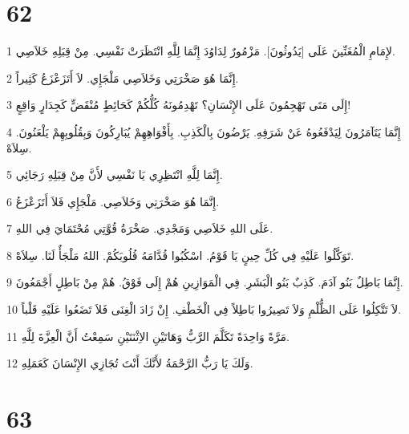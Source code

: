 \chapter{62}

\par 1 لإِمَامِ الْمُغَنِّينَ عَلَى [يَدُوثُونَ]. مَزْمُورٌ لِدَاوُدَ إِنَّمَا لِلَّهِ انْتَظَرَتْ نَفْسِي. مِنْ قِبَلِهِ خَلاَصِي.
\par 2 إِنَّمَا هُوَ صَخْرَتِي وَخَلاَصِي مَلْجَإِي. لاَ أَتَزَعْزَعُ كَثِيراً.
\par 3 إِلَى مَتَى تَهْجِمُونَ عَلَى الإِنْسَانِ؟ تَهْدِمُونَهُ كُلُّكُمْ كَحَائِطٍ مُنْقَضٍّ كَجِدَارٍ وَاقِعٍ!
\par 4 إِنَّمَا يَتَآمَرُونَ لِيَدْفَعُوهُ عَنْ شَرَفِهِ. يَرْضُونَ بِالْكَذِبِ. بِأَفْوَاهِهِمْ يُبَارِكُونَ وَبِقُلُوبِهِمْ يَلْعَنُونَ. سِلاَهْ.
\par 5 إِنَّمَا لِلَّهِ انْتَظِرِي يَا نَفْسِي لأَنَّ مِنْ قِبَلِهِ رَجَائِي.
\par 6 إِنَّمَا هُوَ صَخْرَتِي وَخَلاَصِي. مَلْجَإِي فَلاَ أَتَزَعْزَعُ.
\par 7 عَلَى اللهِ خَلاَصِي وَمَجْدِي. صَخْرَةُ قُوَّتِي مُحْتَمَايَ فِي اللهِ.
\par 8 تَوَكَّلُوا عَلَيْهِ فِي كُلِّ حِينٍ يَا قَوْمُ. اسْكُبُوا قُدَّامَهُ قُلُوبَكُمْ. اللهُ مَلْجَأٌ لَنَا. سِلاَهْ.
\par 9 إِنَّمَا بَاطِلٌ بَنُو آدَمَ. كَذِبٌ بَنُو الْبَشَرِ. فِي الْمَوَازِينِ هُمْ إِلَى فَوْقُ. هُمْ مِنْ بَاطِلٍ أَجْمَعُونَ.
\par 10 لاَ تَتَّكِلُوا عَلَى الظُّلْمِ وَلاَ تَصِيرُوا بَاطِلاً فِي الْخَطْفِ. إِنْ زَادَ الْغِنَى فَلاَ تَضَعُوا عَلَيْهِ قَلْباً.
\par 11 مَرَّةً وَاحِدَةً تَكَلَّمَ الرَّبُّ وَهَاتَيْنِ الاِثْنَتَيْنِ سَمِعْتُ أَنَّ الْعِزَّةَ لِلَّهِ.
\par 12 وَلَكَ يَا رَبُّ الرَّحْمَةُ لأَنَّكَ أَنْتَ تُجَازِي الإِنْسَانَ كَعَمَلِهِ.

\chapter{63}

